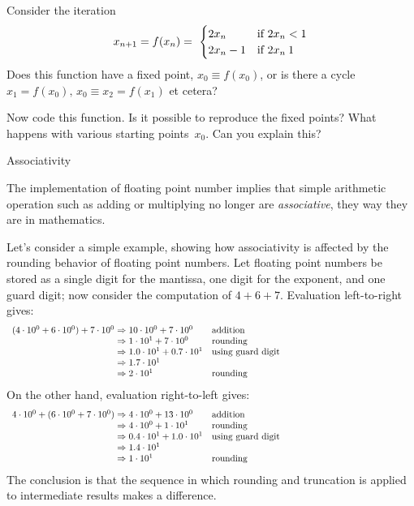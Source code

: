 \begin{comment}
Exercise: sine function through power series. How to deal with the
alternating signs?
\end{comment}

\begin{exercise}
  Consider the iteration
  \begin{equation}
    x_{n+1}=f(x_n) = \
  \begin{cases}
    2x_n&\hbox{if $2x_n<1$}\\
    2x_n-1&\hbox{if $2x_n\>1$}\\
  \end{cases}
  \end{equation}
  Does this function have a fixed point, $x_0\equiv f(x_0)$, or is there a cycle
  $x_1=f(x_0),\,x_0\equiv x_2=f(x_1)$ et cetera?

  Now code this function. Is it possible to reproduce the fixed
  points?
  What happens with various starting
  points~$x_0$. Can you explain this?
\end{exercise}

 {Associativity}
\label{sec:fp-associative}

The implementation of floating point number implies
that simple arithmetic operation such as adding or multiplying
no longer are 
\emph{associative},
they way they are in mathematics.

Let's consider a simple example, showing how associativity is affected
by the rounding behavior of floating point numbers.
Let floating point numbers be stored as a single digit for the mantissa,
one digit for the exponent, and one guard digit;
now consider the computation of $4+6+7$.
Evaluation left-to-right gives:
\begin{equation}
\begin{array}{l@{{}\Rightarrow{}}lp{3in}}
(4\cdot10^0 + 6\cdot10^0)+7\cdot10^0&10\cdot10^0+7\cdot10^0&addition\\
&1\cdot 10^1 + 7\cdot10^0&rounding\\
&1.0\cdot 10^1 + 0.7\cdot10^1&using guard digit\\
&1.7\cdot 10^1\\
&2\cdot10^1&rounding
\end{array}
\end{equation}
On the other hand, evaluation right-to-left gives:
\begin{equation}
\begin{array}{l@{{}\Rightarrow{}}lp{3in}}
4\cdot10^0 + (6\cdot10^0 + 7\cdot10^0)&4\cdot 10^0 + 13\cdot10^0&addition\\
&4\cdot 10^0 + 1\cdot10^1&rounding\\
&0.4\cdot 10^1 + 1.0\cdot10^1&using guard digit\\
&1.4\cdot 10^1\\
&1\cdot10^1&rounding
\end{array}
\end{equation}
The conclusion is that the sequence in which rounding and truncation is applied to
intermediate results makes a difference.

